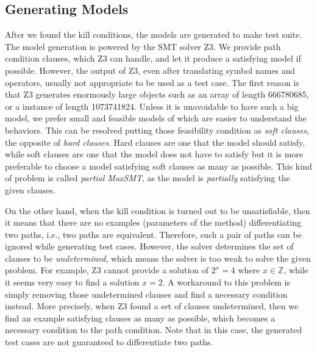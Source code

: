 \documentclass{article}
\begin{document}
\subsection{Generating Models}

\iffalse
Kill conditions가 satisfiable 한 경우에 대해 model generation (Z3)

Feasibility condition: string이나array가 너무 길면 human readable하지 않기 때문에 패스 컨디션을 만족하면서 짧은 string이나 array를 선호한다. -> 이런 condition들은 반드시 만족해야 하는 hard clause들은 아니기 때문에 soft clause로 추가하고, 이 (weighted partial) MaxSMT는 Z3의 optimize solver를 이용해 풀 수 있다.

unsatisfiable한 kill condition은 equivalent한 mutant임을 알려줌

satisfiability가 unknown인 clauses를 처리한 방법 서술
-> unknown이면 주어진 clauses중에서 하나씩 빼가면서 sat이 나올 때까지 check한다
즉 necessary and sufficient condition을 구할 수 없을 때는 maximal(in the sense of the number of satisfied clauses)한 necessary condition을 구하는 것
\fi

After we found the kill conditions, the models are generated to make test suite. The model generation is powered by the SMT solver Z3. We provide path condition clauses, which Z3 can handle, and let it produce a satisfying model if possible. However, the output of Z3, even after translating symbol names and operators, usually not appropriate to be used as a test case. The first reason is that Z3 generates enormously large objects such as an array of length 666780685, or a  instance of length 1073741824. Unless it is unavoidable to have such a big model, we prefer small and feasible models of which are easier to understand the behaviors. This can be resolved putting those feasibility condition as \emph{soft clauses}, the opposite of \emph{hard clauses}. Hard clauses are one that the model should satisfy, while soft clauses are one that the model does not have to satisfy but it is more preferable to choose a model satisfying soft clauses as many as possible. This kind of problem is called \emph{partial MaxSMT}, as the model is \emph{partially} satisfying the given clauses.

On the other hand, when the kill condition is turned out to be unsatisfiable, then it means that there are no examples (parameters of the method) differentiating two paths, i.e., two paths are equivalent. Therefore, such a pair of paths can be ignored while generating test cases. However, the solver determines the set of clauses to be \emph{undetermined}, which means the solver is too weak to solve the given problem. For example, Z3 cannot provide a solution of $2^x = 4$ where $x\in\mathbb Z$, while it seems very easy to find a solution $x=2$. A workaround to this problem is simply removing those undetermined clauses and find a necessary condition instead. More precisely, when Z3 found a set of clauses undetermined, then we find an example satisfying clauses as many as possible, which becomes a necessary condition to the path condition. Note that in this case, the generated test cases are not guaranteed to differentiate two paths.
\end{document}
